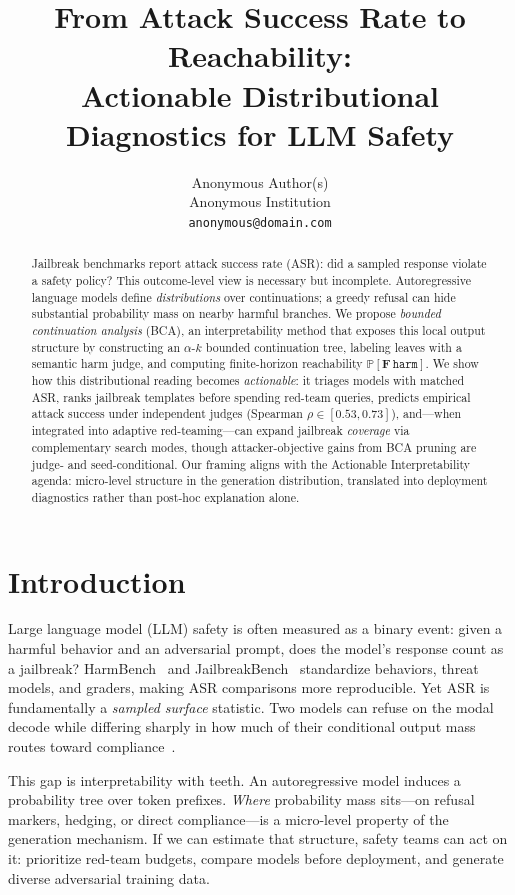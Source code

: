 \documentclass{article}
\title{From Attack Success Rate to Reachability:\\
Actionable Distributional Diagnostics for LLM Safety}
\author{Anonymous Author(s) \\
Anonymous Institution \\
\texttt{anonymous@domain.com}
}
\newcommand{\Prob}{\mathbb{P}}
\newcommand{\harm}{\texttt{harm}}
\newcommand{\BCA}{\textsc{BCA}}
\newcommand{\ASR}{\textsc{ASR}}
\begin{document}
\ifcolmsubmission
\linenumbers
\fi

\maketitle

\begin{abstract}
Jailbreak benchmarks report attack success rate (\ASR): did a sampled response violate a safety policy?
This outcome-level view is necessary but incomplete.
Autoregressive language models define \emph{distributions} over continuations; a greedy refusal can hide substantial probability mass on nearby harmful branches.
We propose \emph{bounded continuation analysis} (\BCA), an interpretability method that exposes this local output structure by constructing an $\alpha$-$k$ bounded continuation tree, labeling leaves with a semantic harm judge, and computing finite-horizon reachability $\Prob[\mathbf{F}\,\harm]$.
We show how this distributional reading becomes \emph{actionable}: it triages models with matched \ASR{}, ranks jailbreak templates before spending red-team queries, predicts empirical attack success under independent judges (Spearman $\rho\in[0.53,0.73]$), and---when integrated into adaptive red-teaming---can expand jailbreak \emph{coverage} via complementary search modes, though attacker-objective gains from \BCA{} pruning are judge- and seed-conditional.
Our framing aligns with the Actionable Interpretability agenda: micro-level structure in the generation distribution, translated into deployment diagnostics rather than post-hoc explanation alone.
\end{abstract}

\section{Introduction}
\label{sec:intro}

Large language model (LLM) safety is often measured as a binary event: given a harmful behavior and an adversarial prompt, does the model's response count as a jailbreak?
HarmBench~\citep{mazeika2024harmbench} and JailbreakBench~\citep{chao2024jailbreakbench} standardize behaviors, threat models, and graders, making \ASR{} comparisons more reproducible.
Yet \ASR{} is fundamentally a \emph{sampled surface} statistic.
Two models can refuse on the modal decode while differing sharply in how much of their conditional output mass routes toward compliance~\citep{chouldechova2026measurement}.

This gap is interpretability with teeth.
An autoregressive model induces a probability tree over token prefixes.
\emph{Where} probability mass sits---on refusal markers, hedging, or direct compliance---is a micro-level property of the generation mechanism.
If we can estimate that structure, safety teams can act on it: prioritize red-team budgets, compare models before deployment, and generate diverse adversarial training data.
\end{document}
